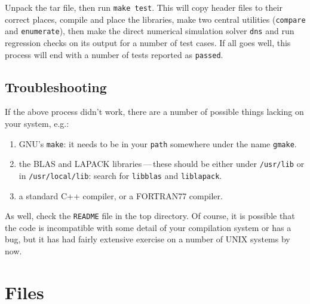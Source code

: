 \documentclass[11pt,a4paper]{report}
\begin{document}
Unpack the tar file, then run \texttt{make test}. This will copy
header files to their correct places, compile and place the libraries,
make two central utilities (\texttt{compare} and \texttt{enumerate}),
then make the direct numerical simulation solver \texttt{dns} and run
regression checks on its output for a number of test cases. If all
goes well, this process will end with a number of tests reported as
\texttt{passed}. 

\subsection{Troubleshooting}
If the above process didn't work, there are a number of possible
things lacking on your system, e.g.:
\begin{enumerate}
\item
GNU's \texttt{make}: it needs to be in your
\texttt{path} somewhere under the name \texttt{gmake}.
\item
the BLAS and LAPACK libraries\,---\,these should be
either under \texttt{/usr/lib} or in \texttt{/usr/local/lib}: search
for \texttt{libblas} and \texttt{liblapack}.
\item
a standard C++ compiler, or a FORTRAN77 compiler.
\end{enumerate}
As well, check the \texttt{README} file in the top directory. Of
course, it is possible that the code is incompatible with some detail
of your compilation system or has a bug, but it has had fairly
extensive exercise on a number of UNIX systems by now.


\section{Files}
\end{document}
